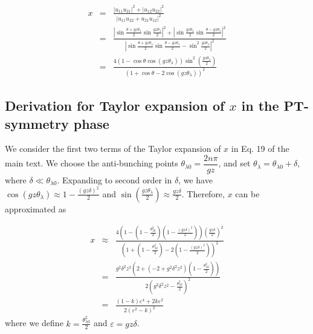 \documentclass[%
reprint,
superscriptaddress,
amsthm,amsmath,amssymb,
aps,
]{revtex4-1}
\begin{document}
\begin{eqnarray}
	x&=&\frac{ \left| u_{11} u_{21} \right|^2
		+ \left| u_{12} u_{22} \right|^2}{
		\left| u_{11} u_{22} + u_{21} u_{12} \right|^2}\nonumber\\
	&=&	\frac{ \left| \sin \frac{\theta+gz\theta_{\lambda}}{2}  \sin \frac{gz\theta_{\lambda}}{2}\right|^2
		+ \left|  \sin \frac{gz\theta_{\lambda}}{2} \sin \frac{\theta-gz\theta_{\lambda}}{2} \right|^2}{
		\left|\sin \frac{\theta+gz\theta_{\lambda}}{2} \sin \frac{\theta-gz\theta_{\lambda}}{2}- \sin^{2} \frac{gz\theta_{\lambda}}{2}\right|^2}\nonumber\\
	&=&\frac{4 \left( 1 - \cos \theta \cos(gz \theta_{\lambda}) \right) \sin^2 \left( \frac{gz \theta_{\lambda}}{2} \right)}{\left( 1 + \cos \theta - 2 \cos(gz \theta_{\lambda}) \right)^2}
\end{eqnarray}






\subsection{\label{sec:level54}Derivation for Taylor expansion of $x$ in the PT-symmetry phase }

We consider the first two terms of the Taylor expansion of $x$ in Eq. 19 of the main text. We choose the anti-bunching points $\theta_{\lambda 0}=\dfrac{2n\pi}{gz} $, and set $\theta_{\lambda}=\theta_{\lambda 0}+\delta $, where $\delta\ll \theta_{\lambda 0}$. Expanding to second order in $\delta$, we have $\cos(gz \theta_{\lambda})\approx 1 - \frac{(gz\delta)^2}{2} $ and $ \sin\left( \frac{gz \theta_{\lambda}}{2}\right)\approx \frac{gz\delta}{2}$. Therefore, $x$ can be approximated as

\begin{eqnarray}
	x&\approx&\frac{4\left( 1 - (1-\frac{\theta_{\lambda 0}^{2}}{2})  \left( 1 - \frac{(gz \delta)^2}{2} \right) \right) (\frac{gz \delta}{2})^2}{
		\left( 1 +(1-\frac{\theta_{\lambda 0}^{2}}{2}) - 2 \left( 1 - \frac{(gz \delta)^2}{2} \right) \right)^2
	}\nonumber\\
	&=&\frac{g^2\delta^2 z^2 \left( 2 + (-2 + g^2\delta^2 z^2) (1-\frac{\theta_{\lambda 0}^{2}}{2}) \right)}{2 \left(  g^2\delta^2 z^2-\frac{\theta_{\lambda 0}^{2}}{2} \right)^2}
	\nonumber\\
	&=&\frac{\left( 1 - k \right) \varepsilon^4 +2k\varepsilon^{2}}{2 \left( \varepsilon^{2}-k \right)^2}
\end{eqnarray}
where we define $k= \frac{\theta_{\lambda 0}^{2}}{2}$ and $\varepsilon=gz\delta $. 
\end{document}
